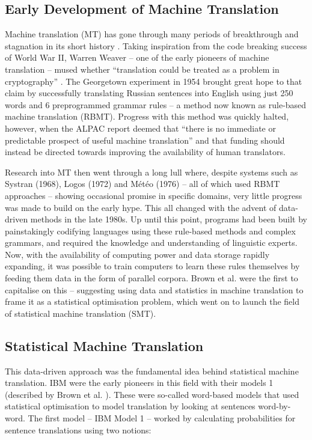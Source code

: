 \documentclass[11pt]{article}
\begin{document}
\subsection{Early Development of Machine Translation}
Machine translation (MT) has gone through many periods of breakthrough and stagnation in its short history \cite[p. 30]{koehn2020}. Taking inspiration from the code breaking success of World War II, Warren Weaver -- one of the early pioneers of machine translation -- mused whether “translation could be treated as a problem in cryptography” \citeyearpar{weaver}. The Georgetown experiment in 1954 brought great hope to that claim by successfully translating Russian sentences into English using just 250 words and 6 preprogrammed grammar rules \citep{Hutchins2006TheFP} -- a method now known as rule-based machine translation (RBMT). Progress with this method was quickly halted, however, when the ALPAC report \citeyearpar{alpac} deemed that “there is no immediate or predictable prospect of useful machine translation” and that funding should instead be directed towards improving the availability of human translators. 

\bigskip

Research into MT then went through a long lull where, despite systems such as Systran (1968), Logos (1972) and Météo (1976) -- all of which used RBMT approaches -- showing occasional promise in specific domains, very little progress was made to build on the early hype. This all changed with the advent of data-driven methods in the late 1980s. Up until this point, programs had been built by painstakingly codifying languages using these rule-based methods and complex grammars, and required the knowledge and understanding of linguistic experts. Now, with the availability of computing power and data storage rapidly expanding, it was possible to train computers to learn these rules themselves by feeding them data in the form of parallel corpora. Brown et al. \citeyearpar{brown-etal-1990-statistical} were the first to capitalise on this -- suggesting using data and statistics in machine translation to frame it as a statistical optimisation problem, which went on to launch the field of statistical machine translation (SMT).

\subsection{Statistical Machine Translation}

This data-driven approach was the fundamental idea behind statistical machine translation. IBM were the early pioneers in this field with their models 1 (described by Brown et al. \citeyearpar{brown-etal-1993-mathematics}). These were so-called word-based models that used statistical optimisation to model translation by looking at sentences word-by-word. The first model -- IBM Model 1 -- worked by calculating probabilities for sentence translations using two notions:
\end{document}
